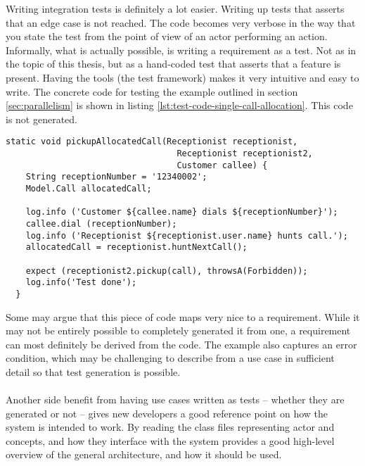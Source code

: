 Writing integration tests is definitely a lot easier. Writing up tests that asserts that an edge case is not reached. The code becomes very verbose in the way that you state the test from the point of view of an actor performing an action. Informally, what is actually possible, is writing a requirement as a test. Not as in the topic of this thesis, but as a hand-coded test that asserts that a feature is present. Having the tools (the test framework) makes it very intuitive and easy to write. The concrete code for testing the example outlined in section \ref{sec:parallelism} is shown in listing \ref{lst:test-code-single-call-allocation}. This code is not generated.
\begin{lstlisting}[style=Dart, caption=Test code for single call allocation,label={lst:test-code-single-call-allocation}]
  static void pickupAllocatedCall(Receptionist receptionist, 
                                  Receptionist receptionist2, 
                                  Customer callee) {
    String receptionNumber = '12340002';
    Model.Call allocatedCall;
    
    log.info ('Customer ${callee.name} dials ${receptionNumber}');
    callee.dial (receptionNumber);
    log.info ('Receptionist ${receptionist.user.name} hunts call.');
    allocatedCall = receptionist.huntNextCall();
   
    expect (receptionist2.pickup(call), throwsA(Forbidden));
    log.info('Test done');
  }
\end{lstlisting}
Some may argue that this piece of code maps very nice to a requirement. While it may not be entirely possible to completely generated it from one, a requirement can most definitely be derived from the code. The example also captures an error condition, which may be challenging to describe from a use case in sufficient detail so that test generation is possible.\\\\
Another side benefit from having use cases written as tests -- whether they are generated or not -- gives new developers a good reference point on how the system is intended to work. By reading the class files representing actor and concepts, and how they interface with the system provides a good high-level overview of the general architecture, and how it should be used.

